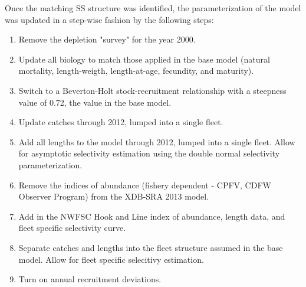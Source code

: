 \documentclass[11pt,
  english,
  a4paper,
]{article}
\begin{document}
\leavevmode\tagmcend\tagstructend\par


Once the matching SS structure was identified, the parameterization of the model was updated in a step-wise fashion by the following steps:

\leavevmode\tagmcend\tagstructend\par

\begin{enumerate}
    \item Remove the depletion "survey" for the year 2000.
    \item Update all biology to match those applied in the base model (natural mortality, length-weigth, length-at-age, fecundity, and maturity).
    \item Switch to a Beverton-Holt stock-recruitment relationship with a steepness value of 0.72, the value in the base model.
    \item Update catches through 2012, lumped into a single fleet.
    \item Add all lengths to the model through 2012, lumped into a single fleet. Allow for asymptotic selectivity estimation using the double normal selectivity parameterization. 
    \item Remove the indices of abundance (fishery dependent - CPFV, CDFW Observer Program) from the XDB-SRA 2013 model.
    \item Add in the NWFSC Hook and Line index of abundance, length data, and fleet specific selectivity curve.
    \item Separate catches and lengths into the fleet structure assumed in the base model. Allow for fleet specific selecitivy estimation.  
    \item Turn on annual recruitment deviations.
\end{enumerate}

\end{document}
